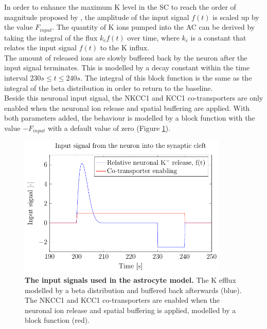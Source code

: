 In order to enhance the maximum \gls{K} level in the SC to reach the order of magnitude proposed by \citet{Filosa2004}, the amplitude of the input signal $f(t)$ is scaled up by the value $F_{input}$. The quantity of \gls{K} ions pumped into the AC can be derived by taking the integral of the flux $k_c f(t)$ over time, where $k_c$ is a constant that relates the input signal $f(t)$ to the \gls{K} influx. \\

The amount of released  ions are slowly buffered back by the neuron after the input signal terminates. This is modelled by a decay constant within the time interval $ 230 s \leq t \leq 240 s$. The integral of this block function is the same as the integral of the beta distribution in order to return to the baseline.\\

Beside this neuronal input signal, the NKCC1 and KCC1 co-transporters are only enabled when the neuronal ion release and spatial buffering are applied.  With both parameters added, the behaviour is modelled by a block function with the value $-F_{input}$ with a default value of zero (Figure \ref{fig:InputSignal}). \\
%
%
\begin{figure}[h!]
	\centering
	\footnotesize %
	\setlength\figureheight{6cm} 
	\setlength\figurewidth{10cm}
        \includegraphics[width = 10cm]{pics/InputSignal.pdf}
	\caption{\textbf{The input signals used in the astrocyte model.} The \gls{K} efflux modelled by a beta distribution and buffered back afterwards (blue). The NKCC1 and KCC1 co-transporters are enabled when the neuronal ion release and spatial buffering is applied, modelled by a block function (red).  }
	\label{fig:InputSignal}
\end{figure}
% 
%
